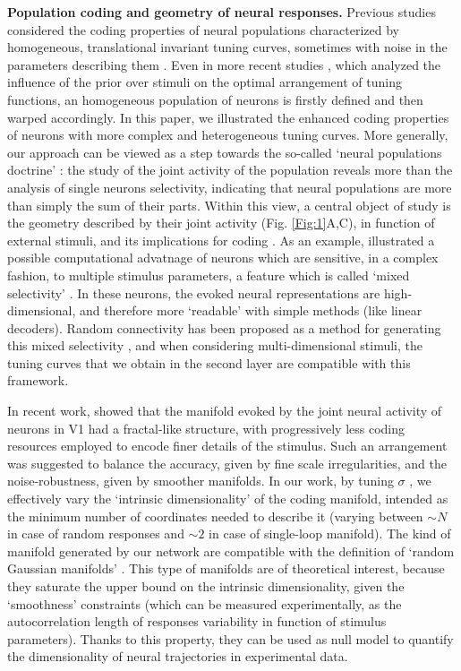 \documentclass[a4paper]{article}%
\begin{document}
\textbf{Population coding and geometry of neural responses.} Previous studies
considered the coding properties of neural populations characterized by
homogeneous, translational invariant tuning curves, sometimes with noise in
the parameters describing them
\cite{Shamir2006ImplicationsCoding,Fiscella2015VisualNeurons}. Even in more
recent studies
\cite{Ganguli2014EfficientPopulations,Yerxa2020EfficientStimuli}, which
analyzed the influence of the prior over stimuli on the optimal arrangement of
tuning functions, an homogeneous population of neurons is firstly defined and
then warped accordingly. In this paper, we illustrated the enhanced coding
properties of neurons with more complex and heterogeneous tuning curves. More
generally, our approach can be viewed as a step towards the so-called `neural
populations doctrine' \cite{Saxena2019TowardsDoctrine}: the study of the joint
activity of the population reveals more than the analysis of single neurons
selectivity, indicating that neural populations are more than simply the sum
of their parts. Within this view, a central object of study is the geometry
described by their joint activity (Fig. \ref{Fig:1}A,C), in function of
external stimuli, and its implications for coding
\cite{Kobak2019State-dependentCortex}. As an example,
\cite{Fusi2016WhyCognition} illustrated a possible computational advatnage of
neurons which are sensitive, in a complex fashion, to multiple stimulus
parameters, a feature which is called `mixed selectivity'
\cite{Rigotti2013TheTasks}. In these neurons, the evoked neural
representations are high-dimensional, and therefore more `readable' with
simple methods (like linear decoders). Random connectivity has been proposed
as a method for generating this mixed selectivity
\cite{Barak2013FromDiscrimination,Lindsay2017HebbianCortex}, and when
considering multi-dimensional stimuli, the tuning curves that we obtain in the
second layer are compatible with this framework.

In recent work, \cite{Stringer2019High-dimensionalCortex} showed that the
manifold evoked by the joint neural activity of neurons in V1 had a
fractal-like structure, with progressively less coding resources employed to
encode finer details of the stimulus. Such an arrangement was suggested to
balance the accuracy, given by fine scale irregularities, and the
noise-robustness, given by smoother manifolds. In our work, by tuning $\sigma$
, we effectively vary the `intrinsic dimensionality' of the coding manifold,
intended as the minimum number of coordinates needed to describe it (varying
between $\sim N$ in case of random responses and $\sim2$ in case of
single-loop manifold). The kind of manifold generated by our network are
compatible with the definition of `random Gaussian manifolds'
\cite{Gao2017AMeasurement,Lahiri2016RandomManifolds}. This type of manifolds
are of theoretical interest, because they saturate the upper bound on the
intrinsic dimensionality, given the `smoothness' constraints (which can be
measured experimentally, as the autocorrelation length of responses
variability in function of stimulus parameters). Thanks to this property, they
can be used as null model to quantify the dimensionality of neural
trajectories in experimental data.
\end{document}
